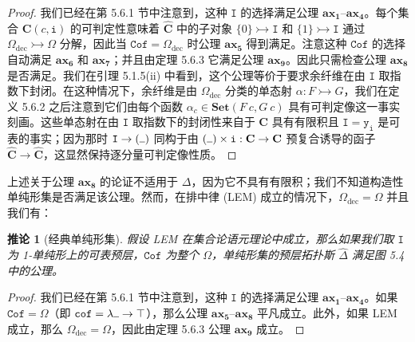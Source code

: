 \documentclass{ctexrep}
\theoremstyle{plain}
\newtheorem{corollary}[theorem]{推论}
\theoremstyle{definition}
\theoremstyle{remark}
\newcommand\ttI{\mathtt{I}}
\newcommand{\ax}[1]{\mathbf{ax_{#1}}}
\newcommand{\ul}{{\rule[0ex]{0.5em}{0.4pt}}} %
\newcommand{\tti}{\mathtt{i}}
\begin{document}
\begin{proof}
我们已经在第 5.6.1 节中注意到，这种 $\ttI$ 的选择满足公理 $\ax{1}$--$\ax{4}$。每个集合 $\mathbf{C}(c, \tti)$ 的可判定性意味着 $\widehat{\mathbf{C}}$ 中的子对象 $\{0\} \rightarrowtail \ttI$ 和 $\{1\} \rightarrowtail \ttI$ 通过 $\Omega_{\mathrm{dec}} \rightarrowtail \Omega$ 分解，因此当 $\mathtt{Cof} = \Omega_{\mathrm{dec}}$ 时公理 $\ax{5}$ 得到满足。注意这种 $\mathtt{Cof}$ 的选择自动满足 $\ax{6}$ 和 $\ax{7}$；并且由定理 5.6.3 它满足公理 $\ax{9}$。因此只需检查公理 $\ax{8}$ 是否满足。我们在引理 5.1.5(ii) 中看到，这个公理等价于要求余纤维在由 $\ttI$ 取指数下封闭。在这种情况下，余纤维是由 $\Omega_{\mathrm{dec}}$ 分类的单态射 $\alpha : F \rightarrowtail G$，我们在定义 5.6.2 之后注意到它们由每个函数 $\alpha_c \in \mathbf{Set}(F\ c, G\ c)$ 具有可判定像这一事实刻画。这些单态射在由 $\ttI$ 取指数下的封闭性来自于 $\mathbf{C}$ 具有有限积且 $\ttI = \mathtt{y}_{\tti}$ 是可表的事实；因为那时 $\ttI \to (\ul )$ 同构于由 $(\ul) \times \tti : \mathbf{C} \to \mathbf{C}$ 预复合诱导的函子 $\widehat{\mathbf{C}} \to \widehat{\mathbf{C}}$，这显然保持逐分量可判定像性质。
\end{proof}

上述关于公理 $\ax{8}$ 的论证不适用于 $\Delta$，因为它不具有有限积；我们不知道构造性单纯形集是否满足该公理。然而，在排中律 (LEM) 成立的情况下，$\Omega_{\mathrm{dec}} = \Omega$ 并且我们有：

\begin{corollary}[经典单纯形集]
假设 LEM 在集合论语元理论中成立，那么如果我们取 $\ttI$ 为 1-单纯形上的可表预层，$\mathtt{Cof}$ 为整个 $\Omega$，单纯形集的预层拓扑斯 $\widehat{\Delta}$ 满足图 5.4 中的公理。
\end{corollary}

\begin{proof}
我们已经在第 5.6.1 节中注意到，这种 $\ttI$ 的选择满足公理 $\ax{1}$--$\ax{4}$。如果 $\mathtt{Cof} = \Omega$（即 $\mathtt{cof} = \lambda\ul  \to \top$），那么公理 $\ax{5}$--$\ax{8}$ 平凡成立。此外，如果 LEM 成立，那么 $\Omega_{\mathrm{dec}} = \Omega$，因此由定理 5.6.3 公理 $\ax{9}$ 成立。
\end{proof}
\end{document}
